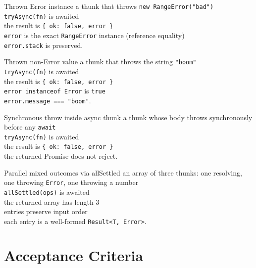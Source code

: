 \begin{scenario}{Thrown Error instance}
\Given a thunk that throws \texttt{new RangeError("bad")} \\
\When \texttt{tryAsync(fn)} is awaited \\
\Then the result is \texttt{\{ ok: false, error \}} \\
\And \texttt{error} is the exact \texttt{RangeError} instance (reference equality) \\
\And \texttt{error.stack} is preserved.
\end{scenario}

\begin{scenario}{Thrown non-Error value}
\Given a thunk that throws the string \texttt{"boom"} \\
\When \texttt{tryAsync(fn)} is awaited \\
\Then the result is \texttt{\{ ok: false, error \}} \\
\And \texttt{error instanceof Error} is \texttt{true} \\
\And \texttt{error.message === "boom"}.
\end{scenario}

\begin{scenario}{Synchronous throw inside async thunk}
\Given a thunk whose body throws synchronously before any \texttt{await} \\
\When \texttt{tryAsync(fn)} is awaited \\
\Then the result is \texttt{\{ ok: false, error \}} \\
\And the returned Promise does not reject.
\end{scenario}

\begin{scenario}{Parallel mixed outcomes via allSettled}
\Given an array of three thunks: one resolving, one throwing \texttt{Error}, one throwing a number \\
\When \texttt{allSettled(ops)} is awaited \\
\Then the returned array has length 3 \\
\And entries preserve input order \\
\And each entry is a well-formed \texttt{Result<T, Error>}.
\end{scenario}

\section{Acceptance Criteria}

